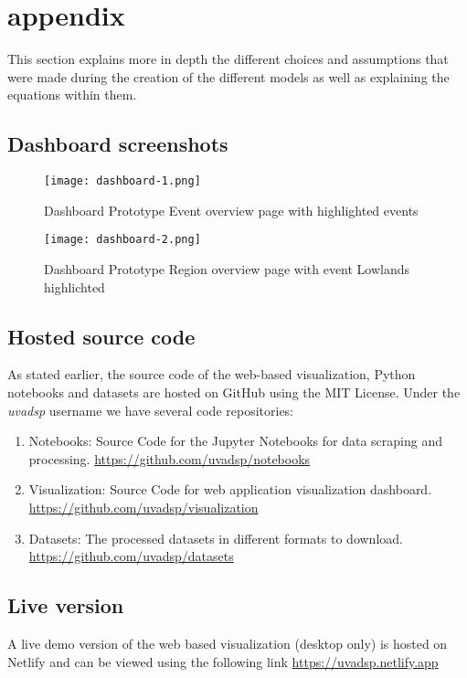 \section{appendix}

This section explains more in depth the different choices and assumptions that were made during the creation of the different models as well as explaining the equations within them.


\subsection{Dashboard screenshots}
\begin{figure*}[!htb]
    \texttt{[image: dashboard-1.png]}
    \caption{Dashboard Prototype Event overview page with highlighted events}
    \label{fig:event}
\end{figure*}


\begin{figure*}[!htbp]
    \texttt{[image: dashboard-2.png]}
    \caption{Dashboard Prototype Region overview page with event Lowlands highlichted }
    \label{fig:event}
\end{figure*}

\subsection{Hosted source code}

As stated earlier, the source code of the web-based visualization, Python notebooks and datasets are hosted on GitHub using the MIT License. Under the \textit{uvadsp} username we have several code repositories:

\begin{enumerate}
  \item Notebooks: Source Code for the Jupyter Notebooks for data scraping and processing. \underline{https://github.com/uvadsp/notebooks}
  \item Visualization: Source Code for web application visualization dashboard. \underline{https://github.com/uvadsp/visualization}
  \item Datasets: The processed datasets in different formats to download. \underline{https://github.com/uvadsp/datasets}
\end{enumerate}

\subsection{Live version}
A live demo version of the web based visualization (desktop only) is hosted on Netlify and can be viewed using the following link \underline{https://uvadsp.netlify.app}

